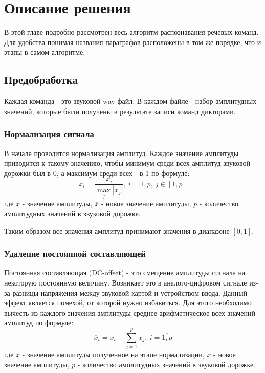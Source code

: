 \section{Описание решения}
В этой главе подробно рассмотрен весь алгоритм распознавания речевых команд. Для удобства понимая названия параграфов расположены в том же порядке, что и этапы в самом алгоритме.

\subsection{Предобработка}
Каждая команда - это звуковой wav файл. В каждом файле - набор амплитудных значений, которые были получены в результате записи команд дикторами. 

\subsubsection{Нормализация сигнала}
В начале проводится нормализация амплитуд. Каждое значение амплитуды приводится к такому значению, чтобы минимум среди всех амплитуд звуковой дорожки был в 0, а максимум среди всех - в 1 по формуле:
\begin{equation}
	\overline{x}_i=\dfrac{x_i}{\max_{j} |x_j|},~i=\overline{1, p},~j \in [1, p]
\end{equation}
где $x$ - значение амплитуды, $\overline{x}$ - новое значение амплитуды, $p$ - количество амплитудных значений в звуковой дорожке.

Таким образом все значения амплитуд принимают значения в диапазоне $[0,1]$.

\subsubsection{Удаление постоянной составляющей}
Постоянная составляющая (DC-offset) - это смещение амплитуды сигнала на некоторую постоянную величину. Возникает это в аналого-цифровом сигнале из-за разницы напряжения между звуковой картой и устройством ввода. Данный эффект является помехой, от которой нужно избавиться. Для этого необходимо вычесть из каждого значения амплитуды среднее арифметическое всех значений амплитуд по формуле:
\begin{equation}
\overline{x}_i=x_i - \sum_{j=1}^{p} x_j,~i=\overline{1, p}
\end{equation}
где $x$ - значение амплитуды полученное на этапе нормализации, $\overline{x}$ - новое значение амплитуды, $p$ - количество амплитудных значений в звуковой дорожке.

